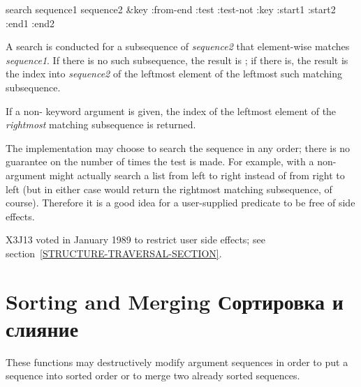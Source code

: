 \begin{defun}[Function]
search sequence1 sequence2 &key :from-end :test :test-not :key :start1 :start2 :end1 :end2

A search is conducted for a subsequence of \emph{sequence2} that
element-wise matches \emph{sequence1}.
If there is no such subsequence, the result is {\false}; if there is,
the result is the index into \emph{sequence2} of the leftmost element
of the leftmost such matching subsequence.

If a non-{\false}  keyword argument is given,
the index of the leftmost
element of the \emph{rightmost} matching subsequence is returned.

The implementation may choose to search the sequence in any order;
there is no guarantee on the number of times the test is made.
For example,  with a non-{\nil} 
argument might actually search a list from left to right
instead of from right to left (but in either case would return
the rightmost matching subsequence, of course).  Therefore it is a good
idea for a user-supplied predicate to be free of side effects.

\begin{new}
X3J13 voted in January 1989
to restrict user side effects; see section~\ref{STRUCTURE-TRAVERSAL-SECTION}.
\end{new}
\end{defun}

\section{Sorting and Merging Сортировка и слияние}

These functions may destructively modify argument sequences
in order to put a sequence into sorted order or to merge two
already sorted sequences.

